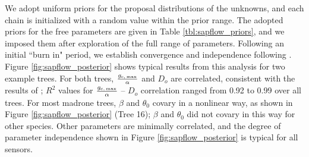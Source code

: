 We adopt uniform priors for the proposal distributions of the unknowns, and each chain is initialized with a random value within the prior range.  The adopted priors for the free parameters are given in Table \ref{tbl:sapflow_priors}, and we imposed them after exploration of the full range of parameters.  Following an initial ``burn in" period, we establish convergence and independence following \cite{raftery}.  Figure \ref{fig:sapflow_posterior} shows typical results from this analysis for two example trees.  For both trees, $\frac{g_{\rm c,\,max}}{\alpha}$ and $D_o$ are correlated, consistent with the results of \cite{oren1999survey}; $R^2$ values for $\frac{g_{\rm c,\,max}}{\alpha}$ -- $D_o$ correlation ranged from 0.92 to 0.99 over all trees.  For most madrone trees, $\beta$ and $\theta_0$ covary in a nonlinear way, as shown in Figure \ref{fig:sapflow_posterior} (Tree 16); $\beta$ and $\theta_0$ did not covary in this way for other species.  Other parameters are minimally correlated, and the degree of parameter independence shown in Figure \ref{fig:sapflow_posterior} is typical for all sensors.
